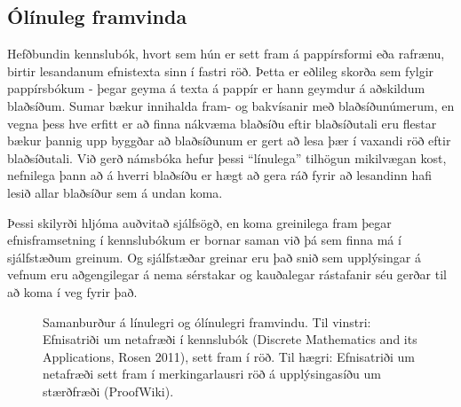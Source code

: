 \documentclass[a4paper,12pt,twoside,BCOR=10mm]{scrbook}
\begin{document}
\subsection{Ólínuleg framvinda}
\label{sec:nonlinearity}
Hefðbundin kennslubók, hvort sem hún er sett fram á pappírsformi eða rafrænu, birtir lesandanum efnistexta sinn í fastri röð. Þetta er eðlileg skorða sem fylgir pappírsbókum - þegar geyma á texta á pappír er hann geymdur á aðskildum blaðsíðum. Sumar bækur innihalda fram- og bakvísanir með blaðsíðunúmerum, en vegna þess hve erfitt er að finna nákvæma blaðsíðu eftir blaðsíðutali eru flestar bækur þannig upp byggðar að blaðsíðunum er gert að lesa þær í vaxandi röð eftir blaðsíðutali. Við gerð námsbóka hefur þessi ``línulega'' tilhögun mikilvægan kost, nefnilega þann að á hverri blaðsíðu er hægt að gera ráð fyrir að lesandinn hafi lesið allar blaðsíður sem á undan koma. 

Þessi skilyrði hljóma auðvitað sjálfsögð, en koma greinilega fram þegar efnisframsetning í kennslubókum er bornar saman við þá sem finna má í sjálfstæðum greinum. Og sjálfstæðar greinar eru það snið sem upplýsingar á vefnum eru aðgengilegar á nema sérstakar og kauðalegar rástafanir séu gerðar til að koma í veg fyrir það.

\begin{figure}
\caption[Samanburður á línulegri og ólínulegri framvindu]{Samanburður á línulegri og ólínulegri framvindu. Til vinstri: Efnisatriði um netafræði í kennslubók (Discrete Mathematics and its Applications, Rosen 2011), sett fram í röð. Til hægri: Efnisatriði um netafræði sett fram í merkingarlausri röð á upplýsingasíðu um stærðfræði (ProofWiki\footnotemark).}

\hfill
{}

\end{figure}
\end{document}
